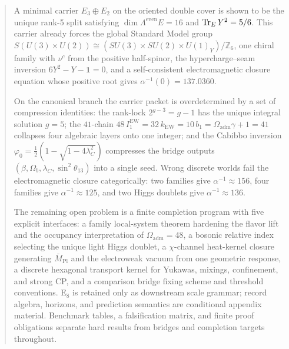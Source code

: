 
\maketitle

\begin{abstract}
A minimal carrier $E_3\oplus E_2$ on the oriented double cover is shown to be the unique rank-5 split satisfying $\dim\Lambda^{\mathrm{even}}E=16$ and $\tr_EY^2=5/6$. This carrier already forces the global Standard Model group $S(U(3)\times U(2))\cong(SU(3)\times SU(2)\times U(1)_Y)/\mathbb Z_6$, one chiral family with $\nu^c$ from the positive half-spinor, the hypercharge--seam inversion $6Y^2-Y-\mathbf 1=0$, and a self-consistent electromagnetic closure equation whose positive root gives $\alpha^{-1}(0)=\num{137.0360}$.

On the canonical branch the carrier packet is overdetermined by a set of compression identities: the rank-lock $2^{g-3}=g-1$ has the unique integral solution $g=5$; the $41$-chain $48\,I_1^{\mathrm{EW}}=32\,k_{\mathrm{EW}}=10\,b_1=\Omega_{\mathrm{adm}}\gamma+1=41$ collapses four algebraic layers onto one integer; and the Cabibbo inversion $\varphi_0=\frac12(1-\sqrt{1-4\lambda_C^2})$ compresses the bridge outputs $(\beta,\Omega_b,\lambda_C,\sin^2\theta_{13})$ into a single seed. Wrong discrete worlds fail the electromagnetic closure categorically: two families give $\alpha^{-1}\approx 156$, four families give $\alpha^{-1}\approx 125$, and two Higgs doublets give $\alpha^{-1}\approx 136$.

The remaining open problem is a finite completion program with five explicit interfaces: a family local-system theorem hardening the flavor lift and the occupancy interpretation of $\Omega_{\mathrm{adm}}=48$, a bosonic relative index selecting the unique light Higgs doublet, a $\chi$-channel heat-kernel closure generating $\bar M_{\mathrm{Pl}}$ and the electroweak vacuum from one geometric response, a discrete hexagonal transport kernel for Yukawas, mixings, confinement, and strong CP, and a comparison bridge fixing scheme and threshold conventions. E$_8$ is retained only as downstream scale grammar; record algebra, horizons, and prediction semantics are conditional appendix material. Benchmark tables, a falsification matrix, and finite proof obligations separate hard results from bridges and completion targets throughout.
\end{abstract}

